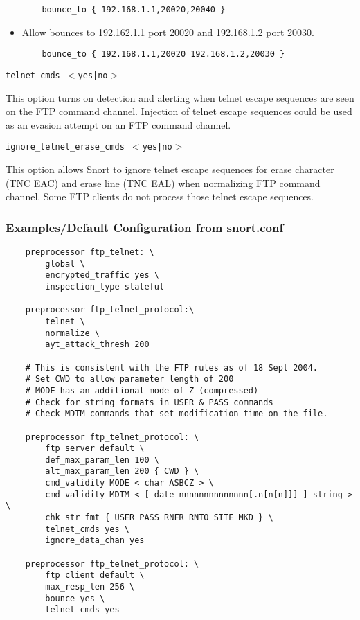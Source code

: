\documentclass[english]{report}
\newcounter{slistnum}
\newenvironment{slist}
{ \begin{list}{ {\bf \arabic{slistnum}.} }{\usecounter{slistnum} } }
{ \end{list} }
\begin{document}
\begin{slist}
\begin{itemize}
\begin{verbatim}
    bounce_to { 192.168.1.1,20020,20040 }
\end{verbatim}

\item Allow bounces to 192.162.1.1 port 20020 and 192.168.1.2 port 20030.

\begin{verbatim}
    bounce_to { 192.168.1.1,20020 192.168.1.2,20030 }
\end{verbatim}

\end{itemize}

\item \texttt{telnet\_cmds $<$yes|no$>$}

This option turns on detection and alerting when telnet escape sequences are
seen on the FTP command channel.  Injection of telnet escape sequences could be
used as an evasion attempt on an FTP command channel.

\item \texttt{ignore\_telnet\_erase\_cmds $<$yes|no$>$}

This option allows Snort to ignore telnet escape sequences for erase character
(TNC EAC) and erase line (TNC EAL) when normalizing FTP command channel.  Some FTP
clients do not process those telnet escape sequences.

\end{slist}

\subsubsection{Examples/Default Configuration from snort.conf}
\begin{verbatim}
    preprocessor ftp_telnet: \
        global \
        encrypted_traffic yes \
        inspection_type stateful

    preprocessor ftp_telnet_protocol:\
        telnet \
        normalize \
        ayt_attack_thresh 200

    # This is consistent with the FTP rules as of 18 Sept 2004.
    # Set CWD to allow parameter length of 200
    # MODE has an additional mode of Z (compressed)
    # Check for string formats in USER & PASS commands
    # Check MDTM commands that set modification time on the file.

    preprocessor ftp_telnet_protocol: \
        ftp server default \
        def_max_param_len 100 \
        alt_max_param_len 200 { CWD } \
        cmd_validity MODE < char ASBCZ > \
        cmd_validity MDTM < [ date nnnnnnnnnnnnnn[.n[n[n]]] ] string > \
        chk_str_fmt { USER PASS RNFR RNTO SITE MKD } \
        telnet_cmds yes \
        ignore_data_chan yes

    preprocessor ftp_telnet_protocol: \
        ftp client default \
        max_resp_len 256 \
        bounce yes \
        telnet_cmds yes
\end{verbatim}
\end{document}
